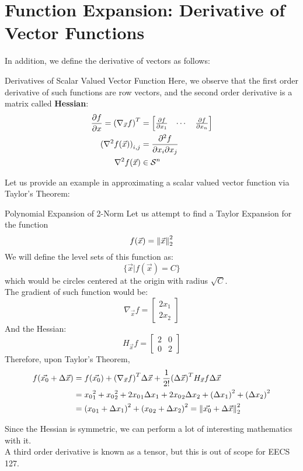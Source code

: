 \section{Function Expansion: Derivative of Vector Functions}
In addition, we define the derivative of vectors as follows:
\begin{ln-define}{Derivatives of Scalar Valued Vector Function}{}
    Here, we observe that the first order derivative of such functions are row vectors, and the second order derivative is a matrix called \textbf{Hessian}:
    \begin{align*}
        \pdv{f}{x} = {(\nabla_{\vec{x}}f)}^T &= \begin{bmatrix} \pdv{f}{x_1} & \cdots & \pdv{f}{x_n} \end{bmatrix} \\
        {(\nabla^2 f(\vec{x}))}_{i,j} &= \pdv{f}{x_i}{x_j} \\
        \nabla^2 f(\vec{x}) &\in \mathcal{S}^n
    \end{align*}
\end{ln-define}
Let us provide an example in approximating a scalar valued vector function via Taylor's Theorem:
\begin{ln-explain}{Polynomial Expansion of 2-Norm}{}
    Let us attempt to find a Taylor Expansion for the function
    \[f(\vec{x}) = \pnorm[2]{\vec{x}}{2}\]
    We will define the level sets of this function as:
    \[
        \{\vec{x} \big| f(\vec{x}) = C\}
    \]
    which would be circles centered at the origin with radius $\sqrt{C}$. \\
    The gradient of such function would be:
    \[
        \nabla_{\vec{x}}f = \begin{bmatrix} 2x_1 \\ 2x_2 \end{bmatrix}
    \]
    And the Hessian:
    \[
        H_{\vec{x}}f = \begin{bmatrix} 2 & 0 \\ 0 & 2 \end{bmatrix}
    \]
    Therefore, upon Taylor's Theorem,
    \begin{align*}
        f(\vec{x_0} + \Delta \vec{x})
        &= f(\vec{x_0}) + {(\nabla_{\vec{x}}f)}^T \Delta \vec{x} + \frac{1}{2!} {(\Delta \vec{x})}^T H_{\vec{x}}f \Delta \vec{x} \\
        &= {x_0}_1^2 + {x_0}_2^2 + 2{x_0}_1 \Delta x_1 + 2{x_0}_2 \Delta x_2 + {(\Delta x_1)}^2 + {(\Delta x_2)}^2 \\
        &= {({x_0}_1 + \Delta x_1)}^2 + {({x_0}_2 + \Delta x_2)}^2 = \pnorm[2]{\vec{x_0} + \Delta \vec{x}}{2}
    \end{align*}
\end{ln-explain}
Since the Hessian is symmetric, we can perform a lot of interesting mathematics with it. \\
A third order derivative is known as a tensor, but this is out of scope for EECS 127.


